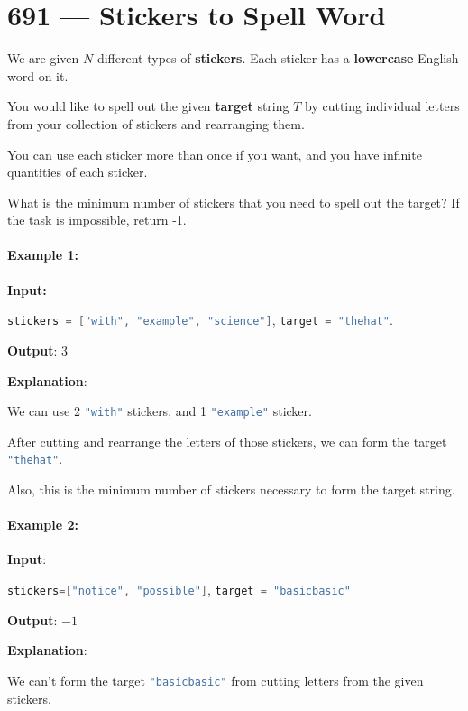 \section{691 --- Stickers to Spell Word}
We are given $N$ different types of \textbf{stickers}. Each sticker has a \textbf{lowercase} English word on it.

You would like to spell out the given \textbf{target} string $T$ by cutting individual letters from your collection of stickers and rearranging them.

You can use each sticker more than once if you want, and you have infinite quantities of each sticker.

What is the minimum number of stickers that you need to spell out the target? If the task is impossible, return -1.
\paragraph{Example 1:}
\begin{flushleft}
\textbf{Input:}

\lstinline[language=C++, basicstyle=\small\ttfamily, keywordstyle=\bfseries\color{green!40!black}]|stickers = ["with", "example", "science"]|, \lstinline[language=C++, basicstyle=\small\ttfamily, keywordstyle=\bfseries\color{green!40!black}]|target = "thehat"|.

\textbf{Output}: 3

\textbf{Explanation}:

We can use 2 \lstinline[language=C++, basicstyle=\small\ttfamily, keywordstyle=\bfseries\color{green!40!black}]|"with"| stickers, and 1 \lstinline[language=C++, basicstyle=\small\ttfamily, keywordstyle=\bfseries\color{green!40!black}]|"example"| sticker.

After cutting and rearrange the letters of those stickers, we can form the target \lstinline[language=C++, basicstyle=\small\ttfamily, keywordstyle=\bfseries\color{green!40!black}]|"thehat"|.

Also, this is the minimum number of stickers necessary to form the target string.
\end{flushleft}

\paragraph{Example 2:}
\begin{flushleft}
\textbf{Input}:

\lstinline[language=C++, basicstyle=\small\ttfamily, keywordstyle=\bfseries\color{green!40!black}]|stickers=["notice", "possible"]|, \lstinline[language=C++, basicstyle=\small\ttfamily, keywordstyle=\bfseries\color{green!40!black}]|target = "basicbasic"|

\textbf{Output}: $-1$

\textbf{Explanation}:

We can't form the target \lstinline[language=C++, basicstyle=\small\ttfamily, keywordstyle=\bfseries\color{green!40!black}]|"basicbasic"| from cutting letters from the given stickers.
\end{flushleft}


